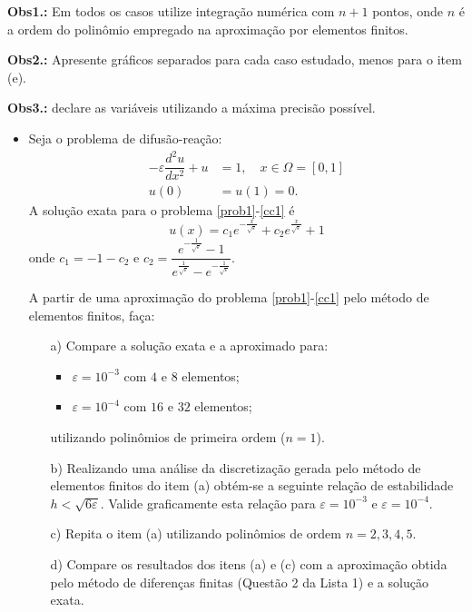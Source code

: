 \documentclass{article}
\newcounter{execs}
\newcommand{\exec}[0]{\addtocounter{execs}{1}\item[\textbf{\arabic{execs}.}]}
\begin{document}
\thispagestyle{first}
    \noindent \textbf{Obs1.:}  Em todos os casos utilize integração numérica com $n+1$ pontos, onde $n$ é a ordem do polinômio empregado na aproximação por elementos finitos.
    
    \noindent \textbf{Obs2.:} Apresente gráficos separados para cada caso estudado, menos para o item (e).

    \noindent \textbf{Obs3.:} declare as variáveis utilizando a máxima precisão possível.
\begin{itemize}

\exec Seja o problema de difusão-reação:
\begin{align} \label{prob1}
- \varepsilon\dfrac{d^2 u}{d x^2} + u &= 1, \quad x\in \Omega= [0,1]
 \\ \label{cc1}
 u(0)&=u(1)=0.
\end{align}
A solução exata para o problema \eqref{prob1}-\eqref{cc1} é
\begin{equation}\label{solexat1}
u(x) = c_1 e^{-\tfrac{x}{\sqrt{\varepsilon}}} + c_2 e^{\tfrac{x}{\sqrt{\varepsilon}}}+1
\end{equation}
onde $c_1 = -1-c_2$ e $c_2 = \dfrac{e^{-\tfrac{1}{\sqrt{\varepsilon}}}-1}
{e^{\tfrac{1}{\sqrt{\varepsilon}}}-e^{-\tfrac{1}{\sqrt{\varepsilon}}}}$. 

A partir de uma aproximação do problema \eqref{prob1}-\eqref{cc1} pelo método de elementos finitos, faça:

\begin{itemize}
  
\item[a)] Compare a solução exata e a aproximado para:
\begin{itemize}
\item $\varepsilon = 10^{-3}$ com $4$ e $8$ elementos;
\item $\varepsilon = 10^{-4}$ com $16$ e $32$ elementos; 
\end{itemize}
utilizando polinômios de primeira ordem ($n=1$).

\item[b)] Realizando uma análise da discretização 
gerada pelo método de elementos finitos do item (a) obtém-se 
a seguinte relação de estabilidade $h<\sqrt{6\varepsilon}$. Valide  
graficamente esta relação para $\varepsilon = 10^{-3}$ e $\varepsilon = 10^{-4}$.

\item[c)] Repita o item (a) utilizando polinômios de ordem $n =2,3,4,5$. 

\item[d)] Compare os resultados dos itens (a) e (c) com 
a aproximação obtida pelo método de 
diferenças finitas (Questão 2 da Lista 1) e a solução exata.


\end{itemize}
\end{itemize}
\end{document}
